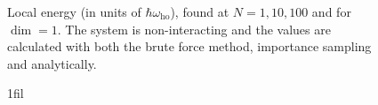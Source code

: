 \documentclass[
]{article}
\makeatletter
\newcommand*{\centerfloat}{%
  \parindent \z@
  \leftskip \z@ \@plus 1fil \@minus \textwidth
  \rightskip\leftskip
  \parfillskip \z@skip}
\makeatother
\begin{document}
\begin{figure}[ht]
  \caption{Local energy (in units of $\hbar\omega_\text{ho}$), found at $N=1,10,100$  and for $\dim= 1$. The system is non-interacting and the values are calculated with both the brute force method, importance sampling and analytically.}
  \label{fig:BF_vs_IM_VS_analytical_1D}
\end{figure}

\begin{figure}[ht]%
  \centerfloat
  \captionsetup[subfigure]{labelformat=empty}
  \\

\end{figure}
\end{document}

